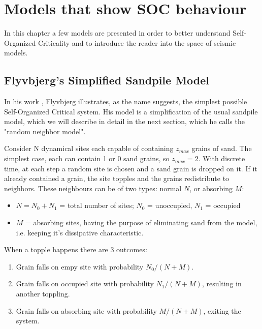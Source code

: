 \chapter{Models that show SOC behaviour}
\label{chap:quakeModels}
In this chapter a few models are presented in order to better understand Self-Organized Criticality and to introduce the reader into the space of seismic models.

\section{Flyvbjerg's Simplified Sandpile Model}
In his work \cite{simplestSOC}, Flyvbjerg illustrates, as the name suggests, the simplest possible Self-Organized Critical system. His model is a simplification of the usual sandpile model, which we will describe in detail in the next section, which he calls the "random neighbor model".\par 
Consider N dynamical sites each capable of containing $z_{max}$ grains of sand. The simplest case, each can contain 1 or 0 sand grains, so $z_{max}=2$. With discrete time, at each step a random site is chosen and a sand grain is dropped on it. If it already contained a grain, the site topples and the grains redistribute to neighbors. These neighbours can be of two types: normal $N$, or absorbing $M$:
\begin{itemize}
	\item $N=N_0+N_1$ = total number of sites; $N_0$ = unoccupied, $N_1$ = occupied
	\item $M$ = absorbing sites, having the purpose of eliminating sand from the model, i.e. keeping it's dissipative characteristic.
\end{itemize}  \par 

When a topple happens there are 3 outcomes:
\begin{enumerate}
	\item Grain falls on empy site with probability $N_0/(N+M)$.
	\item Grain falls on occupied site with probability $N_1/(N+M)$, resulting in another toppling.
	\item Grain falls on absorbing site with probability $M/(N+M)$, exiting the system.
\end{enumerate}\par

